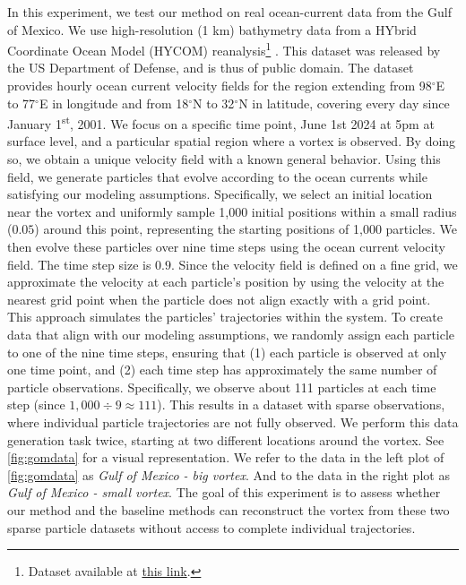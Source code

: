 In this experiment, we test our method on real ocean-current data from the Gulf of Mexico. We use high-resolution (1 km) bathymetry data from a HYbrid Coordinate Ocean Model (HYCOM) reanalysis\footnote{Dataset available at \href{https://www.hycom.org/data/gomb0pt01/gom-reanalysis}{this link}.} \citep{panagiotis2014gulf}. This dataset was released by the US Department of Defense, and is thus of public domain. The dataset provides hourly ocean current velocity fields for the region extending from 98$^{\circ}$E to 77$^{\circ}$E in longitude and from 18$^{\circ}$N to 32$^{\circ}$N in latitude, covering every day since January 1\textsuperscript{st}, 2001. We focus on a specific time point, June 1st 2024 at 5pm at surface level, and a particular spatial region where a vortex is observed. By doing so, we obtain a unique velocity field with a known general behavior. Using this field, we generate particles that evolve according to the ocean currents while satisfying our modeling assumptions. Specifically, we select an initial location near the vortex and uniformly sample 1,000 initial positions within a small radius ($0.05$) around this point, representing the starting positions of 1,000 particles. We then evolve these particles over nine time steps using the ocean current velocity field. The time step size is $0.9$. Since the velocity field is defined on a fine grid, we approximate the velocity at each particle's position by using the velocity at the nearest grid point when the particle does not align exactly with a grid point. This approach simulates the particles' trajectories within the system. To create data that align with our modeling assumptions, we randomly assign each particle to one of the nine time steps, ensuring that (1) each particle is observed at only one time point, and (2) each time step has approximately the same number of particle observations. Specifically, we observe about 111 particles at each time step (since $1,000 \div 9 \approx 111$). This results in a dataset with sparse observations, where individual particle trajectories are not fully observed. We perform this data generation task twice, starting at two different locations around the vortex. See \cref{fig:gomdata} for a visual representation. We refer to the data in the left plot of \cref{fig:gomdata} as \textit{Gulf of Mexico - big vortex}. And to the data in the right plot as \textit{Gulf of Mexico - small vortex}. The goal of this experiment is to assess whether our method and the baseline methods can reconstruct the vortex from these two sparse particle datasets without access to complete individual trajectories.


